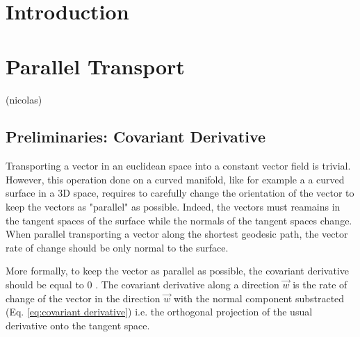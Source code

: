 \documentclass[sigconf]{acmart}
\begin{document}



\maketitle

\section{Introduction}

\section{Parallel Transport}
(nicolas)
\subsection{Preliminaries: Covariant Derivative}
Transporting a vector in an euclidean space into a constant vector field is trivial. However, this operation done on a curved manifold, like for example a a curved surface in a 3D space, requires to carefully change the orientation of the vector to keep the vectors as "parallel" as possible. Indeed, the vectors must reamains in the tangent spaces of the surface while the normals of the tangent spaces change. When parallel transporting a vector along the shortest geodesic path, the vector rate of change should be only normal to the surface. 

More formally, to keep the vector as parallel as possible, the covariant derivative should be equal to 0 \cite{youtube_video}. The covariant derivative along a direction $\vec{w} $ is the rate of change of the vector in the direction $\vec{w}$ with the normal component substracted (Eq. \ref{eq:covariant derivative}) i.e. the orthogonal projection of the usual derivative onto the tangent space.
\end{document}
